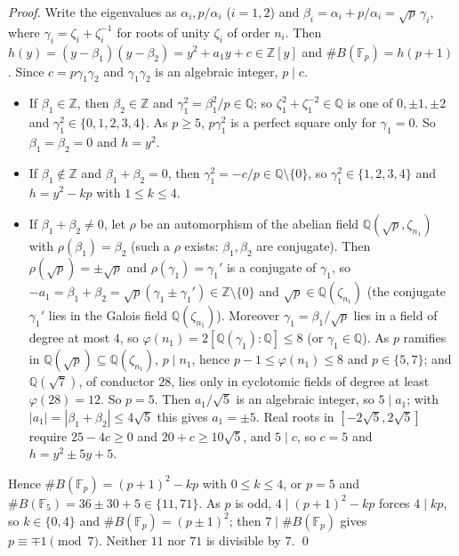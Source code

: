 \documentclass[11pt]{article}
\newcommand{\Q}{\mathbb Q}
\newcommand{\Z}{\mathbb Z}
\newcommand{\F}{\mathbb F}
\begin{document}
\emph{Proof.} Write the eigenvalues as \(\alpha_i,p/\alpha_i\) (\(i=1,2\)) and \(\beta_i=\alpha_i+p/\alpha_i=\sqrt
p\,\gamma_i\), where \(\gamma_i=\zeta_i+\zeta_i^{-1}\) for roots of unity \(\zeta_i\) of order \(n_i\). Then
\(h(y)=(y-\beta_1)(y-\beta_2)=y^2+a_1y+c\in\Z[y]\) and \(\#B(\F_p)=h(p+1)\). Since \(c=p\gamma_1\gamma_2\) and
\(\gamma_1\gamma_2\) is an algebraic integer, \(p\mid c\).
\begin{itemize}
\item If \(\beta_1\in\Z\), then \(\beta_2\in\Z\) and \(\gamma_1^2=\beta_1^2/p\in\Q\); so
\(\zeta_1^2+\zeta_1^{-2}\in\Q\) is one of \(0,\pm1,\pm2\) and \(\gamma_1^2\in\{0,1,2,3,4\}\). As \(p\ge5\),
\(p\gamma_1^2\) is a perfect square only for \(\gamma_1=0\). So \(\beta_1=\beta_2=0\) and \(h=y^2\).
\item If \(\beta_1\notin\Z\) and \(\beta_1+\beta_2=0\), then \(\gamma_1^2=-c/p\in\Q\setminus\{0\}\), so
\(\gamma_1^2\in\{1,2,3,4\}\) and \(h=y^2-kp\) with \(1\le k\le4\).
\item If \(\beta_1+\beta_2\ne0\), let \(\rho\) be an automorphism of the abelian field \(\Q(\sqrt p,\zeta_{n_1})\)
with \(\rho(\beta_1)=\beta_2\) (such a \(\rho\) exists: \(\beta_1,\beta_2\) are conjugate). Then
\(\rho(\sqrt p)=\pm\sqrt p\) and \(\rho(\gamma_1)=\gamma_1'\) is a conjugate of \(\gamma_1\), so
\(-a_1=\beta_1+\beta_2=\sqrt p(\gamma_1\pm\gamma_1')\in\Z\setminus\{0\}\) and \(\sqrt p\in\Q(\zeta_{n_1})\) (the
conjugate \(\gamma_1'\) lies in the Galois field \(\Q(\zeta_{n_1})\)). Moreover \(\gamma_1=\beta_1/\sqrt p\) lies in a
field of degree at most \(4\), so \(\varphi(n_1)=2[\Q(\gamma_1):\Q]\le8\) (or \(\gamma_1\in\Q\)). As \(p\) ramifies
in \(\Q(\sqrt p)\subseteq\Q(\zeta_{n_1})\), \(p\mid n_1\), hence \(p-1\le\varphi(n_1)\le8\) and \(p\in\{5,7\}\);
and \(\Q(\sqrt7)\), of conductor \(28\), lies only in cyclotomic fields of degree at least \(\varphi(28)=12\). So
\(p=5\). Then \(a_1/\sqrt5\) is an algebraic integer, so \(5\mid a_1\); with
\(|a_1|=|\beta_1+\beta_2|\le4\sqrt5\) this gives \(a_1=\pm5\). Real roots in \([-2\sqrt5,2\sqrt5]\) require
\(25-4c\ge0\) and \(20+c\ge10\sqrt5\), and \(5\mid c\), so \(c=5\) and \(h=y^2\pm5y+5\).
\end{itemize}
Hence \(\#B(\F_p)=(p+1)^2-kp\) with \(0\le k\le4\), or \(p=5\) and \(\#B(\F_5)=36\pm30+5\in\{11,71\}\). As \(p\) is
odd, \(4\mid(p+1)^2-kp\) forces \(4\mid kp\), so \(k\in\{0,4\}\) and \(\#B(\F_p)=(p\pm1)^2\); then
\(7\mid\#B(\F_p)\) gives \(p\equiv\mp1\pmod7\). Neither \(11\) nor \(71\) is divisible by \(7\). \qed
\end{document}
